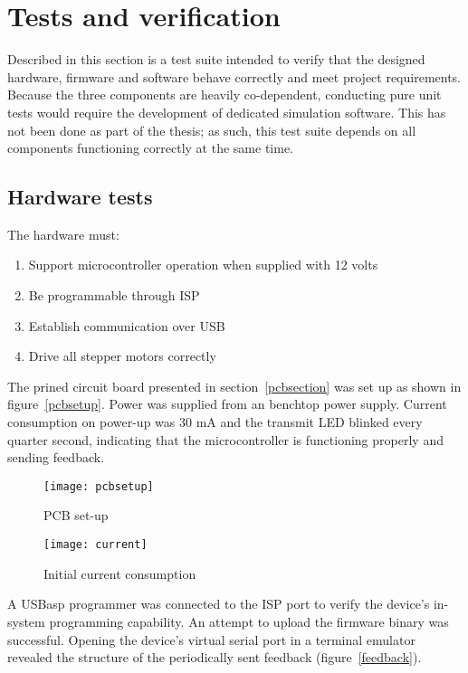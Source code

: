\clearpage
\section{Tests and verification}

Described in this section is a test suite intended to verify that the designed
hardware, firmware and software behave correctly and meet project requirements.
Because the three components are heavily co-dependent, conducting pure unit
tests would require the development of dedicated simulation software. This has
not been done as part of the thesis; as such, this test suite depends on all
components functioning correctly at the same time.

\subsection{Hardware tests}

The hardware must:
\begin{enumerate}
    \item Support microcontroller operation when supplied with 12 volts
    \item Be programmable through ISP
    \item Establish communication over USB
    \item Drive all stepper motors correctly
\end{enumerate}

The prined circuit board presented in section~\ref{pcbsection} was set up as
shown in figure~\ref{pcbsetup}. Power was supplied from an benchtop power
supply. Current consumption on power-up was 30 mA and the transmit LED blinked
every quarter second, indicating that the microcontroller is functioning
properly and sending feedback.

\begin{figure}[ht]
    \centering
    \begin{minipage}{0.5\textwidth}
        \centering
        \texttt{[image: pcbsetup]}
        \caption{PCB set-up}
        \label{pcbsetup}
    \end{minipage}\hfill
    \begin{minipage}{0.5\textwidth}
        \centering
        \texttt{[image: current]}
        \caption{Initial current consumption}
        \label{current}
    \end{minipage}
\end{figure}

A USBasp programmer was connected to the ISP port to verify the device's
in-system programming capability. An attempt to upload the firmware binary was
successful. Opening the device's virtual serial port in a terminal emulator
revealed the structure of the periodically sent feedback
(figure~\ref{feedback}).

